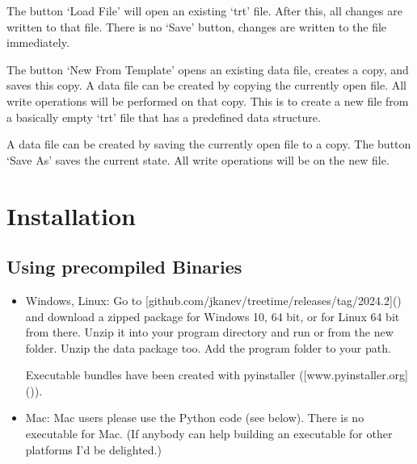 \documentclass[letterpaper,10pt,english]{sphinxmanual}
\begin{document}
\sphinxAtStartPar
The button ‘Load File’ will open an existing ‘trt’ file. After this, all changes are written to that file. There is no ‘Save’ button, changes are written to the file immediately.

\sphinxAtStartPar
The button ‘New From Template’ opens an existing data file, creates a copy, and saves this copy. A data file can be created by copying the currently open file. All write operations will be performed on that copy. This is to create a new file from a basically empty ‘trt’ file that has a pre\sphinxhyphen{}defined data structure.

\sphinxAtStartPar
A data file can be created by saving the currently open file to a copy. The button ‘Save As’ saves the current state. All write operations will be on the new file.


\section{Installation}
\label{\detokenize{introduction:installation}}

\subsection{Using pre\sphinxhyphen{}compiled Binaries}
\label{\detokenize{introduction:using-pre-compiled-binaries}}\begin{itemize}
\item {} 
\sphinxAtStartPar
Windows, Linux: Go to {[}github.com/jkanev/treetime/releases/tag/2024.2{]}() and download a zipped package for Windows 10, 64 bit, or for Linux 64 bit from there. Unzip it into your program directory and run  or  from the new folder. Unzip the data package too. Add the program folder to your path.

\sphinxAtStartPar
Executable bundles have been created with pyinstaller ({[}www.pyinstaller.org{]}()).

\item {} 
\sphinxAtStartPar
Mac: Mac users please use the Python code (see below). There is no executable for Mac.
(If anybody can help building an executable for other platforms I’d be delighted.)

\end{itemize}
\end{document}
